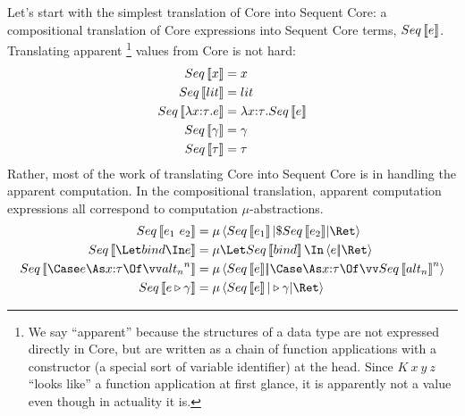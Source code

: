\documentclass{article}
\begin{document}
Let's start with the simplest translation of Core into Sequent Core: a
compositional translation of Core expressions into Sequent Core terms,
$Seq\left\llbracket{e}\right\rrbracket$.  Translating apparent%
\footnote{We say ``apparent'' because the structures of a data type are not
  expressed directly in Core, but are written as a chain of function
  applications with a constructor (a special sort of variable identifier) at the
  head.  Since $K~x~y~z$ ``looks like'' a function application at first glance,
  it is apparently not a value even though in actuality it is.}
values from Core is not hard:
\begin{align*}
  Seq\left\llbracket{x}\right\rrbracket &= x
  \\
  Seq\left\llbracket{lit}\right\rrbracket &= lit
  \\
  Seq\left\llbracket{\lambda{x{:}{\tau}}. e}\right\rrbracket
  &=
  \lambda{x{:}{\tau}}. Seq\left\llbracket{e}\right\rrbracket
  \\
  Seq\left\llbracket{\gamma}\right\rrbracket &= \gamma
  \\
  Seq\left\llbracket{\tau}\right\rrbracket &= \tau
\end{align*}
Rather, most of the work of translating Core into Sequent Core is in handling
the apparent computation.  In the compositional translation, apparent
computation expressions all correspond to computation $\mu$-abstractions.
\begin{align*}
  Seq\trans{\expr_1 ~ \expr_2}
  &=
  \comp{\ann r \ty}
    \braket
    { Seq\trans{\expr_1}
    | \appto{Seq\trans{\expr_2}}
    | \ret r }
  \\
  Seq\trans{\Let \abind \In \expr}
  &=
  \comp{\ann r \ty}\Let Seq\trans{\abind} \In \cut{\expr}{\ret r}
  \\
  Seq\trans{\Case \expr \As \ann{x}{\ty} \Of \vect[n]{\analt_n}}
  &=
  \comp{\ann{r}{\ty}}
    \cut
    {Seq\trans{\expr}}
    {\caseas{\ann{x}{\ty}}{\vect[n]{Seq\trans{\analt_n}}}}
  \\
  Seq\trans{\coerce{\expr}{\cn}}
  &=
  \comp{\ann{r}{\ty}}\braket{Seq\trans{\expr}|\castby{\cn}|\ret{r}}
\end{align*}
\end{document}
